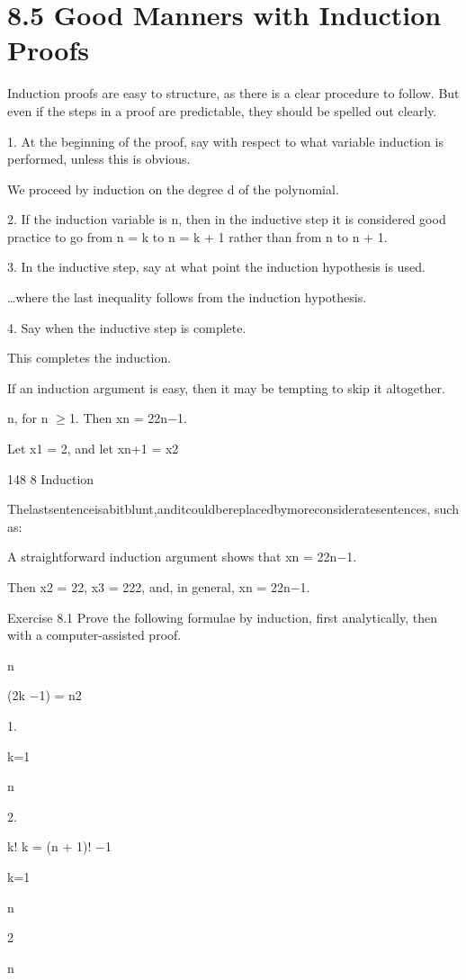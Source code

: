 \documentclass[11pt]{article}
\theoremstyle{plain}
\theoremstyle{definition}
\begin{document}
\section{8.5 Good Manners with Induction Proofs}

Induction proofs are easy to structure, as there is a clear procedure to follow. But even if the steps in a proof are predictable, they should be spelled out clearly.

1. At the beginning of the proof, say with respect to what variable induction is performed, unless this is obvious.

We proceed by induction on the degree d of the polynomial.

2. If the induction variable is n, then in the inductive step it is considered good practice to go from n = k to n = k + 1 rather than from n to n + 1.

3. In the inductive step, say at what point the induction hypothesis is used.

\dots{}where the last inequality follows from the induction hypothesis.

4. Say when the inductive step is complete.

This completes the induction.

If an induction argument is easy, then it may be tempting to skip it altogether.

n, for n $\geq$1. Then xn = 22n$-$1.

Let x1 = 2, and let xn+1 = x2

148 8 Induction

Thelastsentenceisabitblunt,anditcouldbereplacedbymoreconsideratesentences, such as:

A straightforward induction argument shows that xn = 22n$-$1.

Then x2 = 22, x3 = 222, and, in general, xn = 22n$-$1.

Exercise 8.1 Prove the following formulae by induction, first analytically, then with a computer-assisted proof.

n

(2k $-$1) = n2

1.

k=1

n

2.

k! \textperiodcentered{} k = (n + 1)! $-$1

k=1

n

2

n
\end{document}
